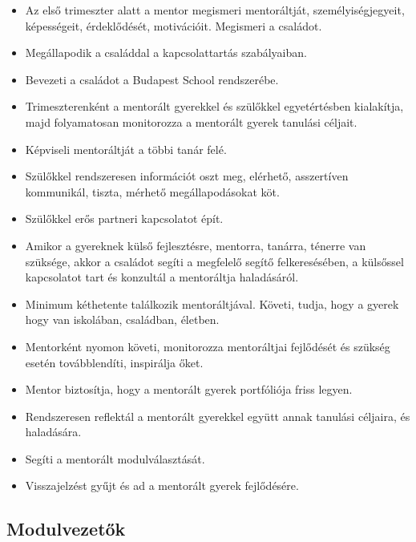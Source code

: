 \begin{itemize}
    \item
          Az első trimeszter alatt a mentor megismeri mentoráltját, személyiségjegyeit, képességeit, érdeklődését, motivációit. Megismeri a családot.
    \item
          Megállapodik a családdal a kapcsolattartás szabályaiban.
    \item
          Bevezeti a családot a Budapest School rendszerébe.
    \item
          Trimeszterenként a mentorált gyerekkel és szülőkkel egyetértésben kialakítja, majd folyamatosan monitorozza a mentorált gyerek tanulási céljait.
    \item
          Képviseli mentoráltját a többi tanár felé.
    \item
          Szülőkkel rendszeresen információt oszt meg, elérhető, asszertíven kommunikál, tiszta, mérhető megállapodásokat köt.
    \item
          Szülőkkel erős partneri kapcsolatot épít.
    \item
          Amikor a gyereknek külső fejlesztésre, mentorra, tanárra, ténerre van szüksége, akkor a családot segíti a megfelelő segítő felkeresésében, a külsőssel kapcsolatot tart és konzultál a mentoráltja haladásáról.
    \item
          Minimum kéthetente találkozik mentoráltjával. Követi, tudja, hogy a gyerek hogy van iskolában, családban, életben.
    \item
          Mentorként nyomon követi, monitorozza mentoráltjai fejlődését és szükség esetén továbblendíti, inspirálja őket.
    \item
          Mentor biztosítja, hogy a mentorált gyerek portfóliója friss legyen.
    \item
          Rendszeresen reflektál a mentorált gyerekkel együtt annak tanulási céljaira, és haladására.
    \item
          Segíti a mentorált modulválasztását.
    \item
          Visszajelzést gyűjt és ad a mentorált gyerek fejlődésére.
\end{itemize}

\subsection{Modulvezetők}\label{modulvezetux151k}


